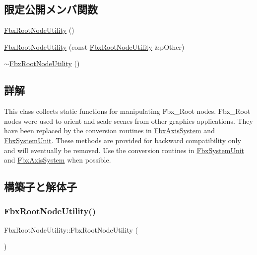 \subsection*{限定公開メンバ関数}
\begin{DoxyCompactItemize}
\item 
\hyperlink{class_fbx_root_node_utility_ad52fd3ddafdce95307b3037d4ded1c4b}{Fbx\+Root\+Node\+Utility} ()
\item 
\hyperlink{class_fbx_root_node_utility_ac3919124c7800d71e61349e438e6fee1}{Fbx\+Root\+Node\+Utility} (const \hyperlink{class_fbx_root_node_utility}{Fbx\+Root\+Node\+Utility} \&p\+Other)
\item 
\hyperlink{class_fbx_root_node_utility_ada6ff546189064e1b87cd2ec6b6843a7}{$\sim$\+Fbx\+Root\+Node\+Utility} ()
\end{DoxyCompactItemize}


\subsection{詳解}
This class collects static functions for manipulating Fbx\+\_\+\+Root nodes. Fbx\+\_\+\+Root nodes were used to orient and scale scenes from other graphics applications. They have been replaced by the conversion routines in \hyperlink{class_fbx_axis_system}{Fbx\+Axis\+System} and \hyperlink{class_fbx_system_unit}{Fbx\+System\+Unit}. These methods are provided for backward compatibility only and will eventually be removed. Use the conversion routines in \hyperlink{class_fbx_system_unit}{Fbx\+System\+Unit} and \hyperlink{class_fbx_axis_system}{Fbx\+Axis\+System} when possible. 

\subsection{構築子と解体子}
\mbox{\label{class_fbx_root_node_utility_ad52fd3ddafdce95307b3037d4ded1c4b}} 
\subsubsection{\texorpdfstring{Fbx\+Root\+Node\+Utility()}{FbxRootNodeUtility()}\hspace{0.1cm}{\footnotesize\ttfamily [1/2]}}
{\footnotesize\ttfamily Fbx\+Root\+Node\+Utility\+::\+Fbx\+Root\+Node\+Utility (\begin{DoxyParamCaption}{ }\end{DoxyParamCaption})\hspace{0.3cm}{\ttfamily [protected]}}

